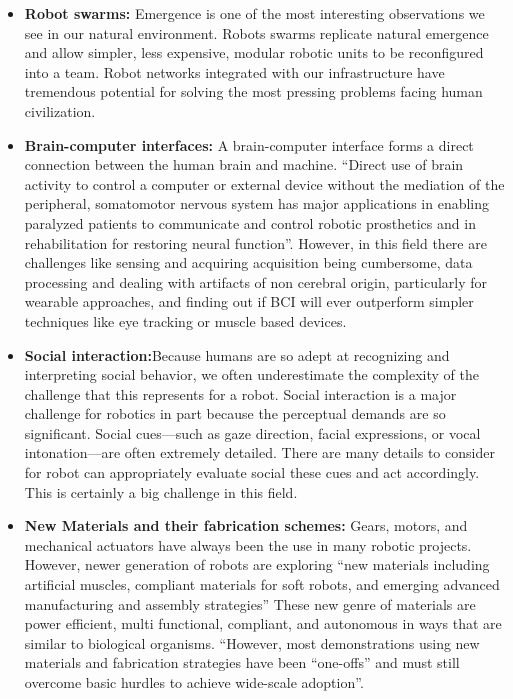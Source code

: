 \documentclass[conference]{IEEEtran}
\begin{document}
\begin{itemize}
\item \textbf{Robot swarms:} Emergence is one of the most interesting observations we see in our natural environment. Robots swarms replicate natural emergence and allow simpler, less expensive, modular robotic units to be reconfigured into a team. Robot networks integrated with our infrastructure have tremendous potential for solving the most pressing problems facing human civilization. 
\item \textbf{Brain-computer interfaces:} A brain-computer interface forms a direct connection between the human brain and machine. ``Direct use of brain activity to control a computer or external device without the mediation of the peripheral, somatomotor nervous system has major applications in enabling paralyzed patients to communicate and control robotic prosthetics and in rehabilitation for restoring neural function''\autocite{yang2018grand}. However, in this field there are challenges like sensing and acquiring acquisition being cumbersome, data processing and dealing with artifacts of non cerebral origin, particularly for wearable approaches, and finding out if BCI will ever outperform simpler techniques like eye tracking or muscle based devices.
\item \textbf{Social interaction:}Because humans are so adept at recognizing and interpreting social behavior, we often underestimate the complexity of the challenge that this represents for a robot. Social interaction is a major challenge for robotics in part because the perceptual demands are so significant. Social cues—such as gaze direction, facial expressions, or vocal intonation—are often extremely detailed. There are many details to consider for robot can appropriately evaluate social these cues and act accordingly. This is certainly a big challenge in this field.
\item \textbf{New Materials and their fabrication schemes:} Gears, motors, and mechanical actuators have always been the use in many robotic projects. However, newer generation of robots are exploring ``new materials including artificial muscles, compliant materials for soft robots, and emerging advanced manufacturing and assembly strategies''\autocite{yang2018grand} These new genre of materials are power efficient, multi functional, compliant, and autonomous in ways that are similar to biological organisms. ``However, most demonstrations using new materials and fabrication strategies have been “one-offs” and must still overcome basic hurdles to achieve wide-scale adoption''\autocite{yang2018grand}. 

\end{itemize}
\end{document}
